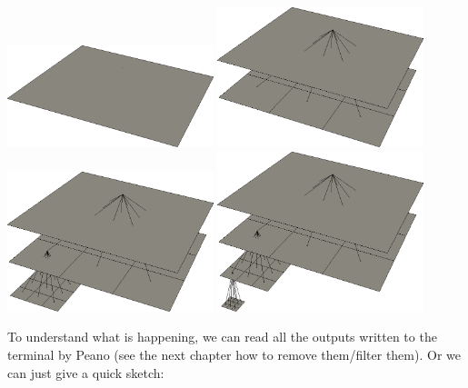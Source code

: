 \begin{center}
  \includegraphics[width=0.45\textwidth]{3_basics/construction00.png}
  \includegraphics[width=0.45\textwidth]{3_basics/construction01.png}
  \includegraphics[width=0.45\textwidth]{3_basics/construction02.png}
  \includegraphics[width=0.45\textwidth]{3_basics/construction03.png}
\end{center}


To understand what is happening, we can read all the outputs written to the
terminal by Peano (see the next chapter how to remove them/filter them).
Or we can just give a quick sketch:

